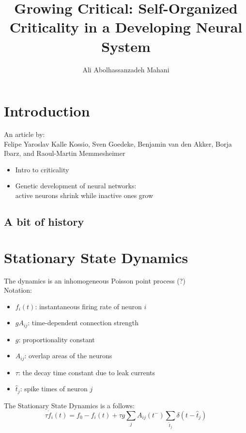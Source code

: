 \documentclass[xcolor=dvipsnames, professionalfont]{beamer}
\author{Ali Abolhassanzadeh Mahani}
\title{Growing Critical: Self-Organized Criticality in a Developing Neural System}
\date{}
\institute{Sharif University of Technology}
\begin{document}
	\frame{\maketitle}
	\section*{Introduction}
	\begin{frame}
		{\centering
		An article by:\\
		Felipe Yaroslav Kalle Kossio, Sven Goedeke, Benjamin van
		den Akker, Borja Ibarz, and Raoul-Martin Memmesheimer
	}
		
		\begin{itemize}
			\item Intro to criticality 
			\pause
			\item Genetic development of neural networks:\\
			active neurons shrink while inactive ones grow
		\end{itemize}
	\end{frame}

	\subsection*{A bit of history}
	\begin{frame}
		
	\end{frame}

	\section*{Stationary State Dynamics}
	\begin{frame}
		The dynamics is an inhomogeneous Poisson point process (?)\\
		Notation: 
		\begin{itemize}
			\item $f_i(t)$: instantaneous firing rate of neuron $i$
			\item $gA_{ij}$: time-dependent connection strength
			\item $g$: proportionality constant
			\item $A_{ij}$: overlap areas of the neurons
			\item $\tau$: the decay time constant due to leak currents
			\item $\hat{t}_j$: spike times of neuron $j$
		\end{itemize}
	\pause
	The Stationary State Dynamics is a follows:
	\begin{equation}
		\tau \dot{f}_i(t) = f_0 - f_i(t) + \tau g \sum_j A_{ij}(t^-) \sum_{\hat{t}_j} \delta(t - \hat{t}_j)
	\end{equation}
	\end{frame}
\end{document}
